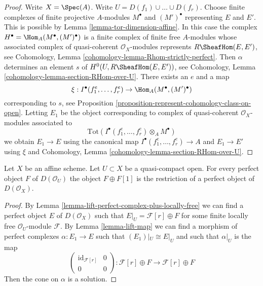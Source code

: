\begin{proof}
Write $X = \Spec(A)$. Write $U = D(f_1) \cup \ldots \cup D(f_r)$. Choose
finite complexes of finite projective $A$-modules $M^\bullet$ and
$(M')^\bullet$ representing $E$ and $E'$. This is possible by
Lemma \ref{lemma-tor-dimension-affine}.
In this case the complex $H^\bullet = \Hom_A(M^\bullet, (M')^\bullet)$
is a finite complex of finite free $A$-modules whose associated
complex of quasi-coherent $\mathcal{O}_X$-modules represents
$R\SheafHom(E, E')$, see
Cohomology, Lemma \ref{cohomology-lemma-Rhom-strictly-perfect}.
Then $\alpha$ determines an element $s$ of $H^0(U, R\SheafHom(E, E'))$, see
Cohomology, Lemma \ref{cohomology-lemma-section-RHom-over-U}.
There exists an $e$ and a map
$$
\xi : I^\bullet(f_1^e, \ldots, f_r^e) \to \Hom_A(M^\bullet, (M')^\bullet)
$$
corresponding to $s$, see
Proposition \ref{proposition-represent-cohomology-class-on-open}.
Letting $E_1$ be the object corresponding to
complex of quasi-coherent $\mathcal{O}_X$-modules
associated to
$$
\text{Tot}(I^\bullet(f_1^e, \ldots, f_r^e) \otimes_A M^\bullet)
$$
we obtain $E_1 \to E$ using the canonical map
$I^\bullet(f_1^e, \ldots, f_r^e) \to A$ and $E_1 \to E'$
using $\xi$ and
Cohomology, Lemma \ref{cohomology-lemma-section-RHom-over-U}.
\end{proof}

\begin{lemma}
\label{lemma-lift-perfect-complex-plus-shift}
Let $X$ be an affine scheme. Let $U \subset X$ be a quasi-compact open.
For every perfect object $F$ of $D(\mathcal{O}_U)$
the object $F \oplus F[1]$ is the restriction of
a perfect object of $D(\mathcal{O}_X)$.
\end{lemma}

\begin{proof}
By Lemma \ref{lemma-lift-perfect-complex-plus-locally-free}
we can find a perfect object $E$ of $D(\mathcal{O}_X)$
such that $E|_U = \mathcal{F}[r] \oplus F$ for some finite locally
free $\mathcal{O}_U$-module $\mathcal{F}$.
By Lemma \ref{lemma-lift-map} we can find a morphism of
perfect complexes $\alpha : E_1 \to E$ such that $(E_1)|_U \cong E|_U$
and such that $\alpha|_U$ is the map
$$
\left(
\begin{matrix}
\text{id}_{\mathcal{F}[r]} & 0 \\
0 & 0
\end{matrix}
\right)
:
\mathcal{F}[r] \oplus F \to \mathcal{F}[r] \oplus F
$$
Then the cone on $\alpha$ is a solution.
\end{proof}

